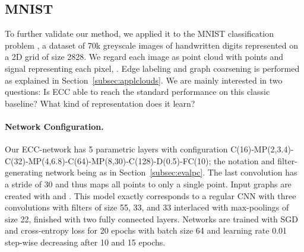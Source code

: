 \documentclass[10pt,twocolumn,letterpaper]{article}
\begin{document}
\begin{table}[bt]
\centering
\addtolength{\tabcolsep}{-3pt}
\addtolength{\tabcolsep}{3pt}
\vspace{1.5ex}
\caption{\label{tab:resgraph}
Mean accuracy (10 folds) on graph classification datasets. Only the best-performing models of each baseline are listed.}
\end{table}





\subsection{MNIST} \label{subsec:evalmnist}

To further validate our method, we applied it to the MNIST classification problem \cite{mnist}, a dataset of 70k greyscale images of handwritten digits represented on a 2D grid of size 2828. We regard each image  as point cloud  with points  and signal  representing each pixel, . Edge labeling and graph coarsening is performed as explained in Section~\ref{subsec:applclouds}. 
We are mainly interested in two questions: Is ECC able to reach the standard performance on this classic baseline? What kind of representation does it learn?

\paragraph*{Network Configuration.}
Our ECC-network has 5 parametric layers with configuration C(16)-MP(2,3.4)-C(32)-MP(4,6.8)-C(64)-MP(8,30)-C(128)-D(0.5)-FC(10); the notation and filter-generating network being as in Section~\ref{subsec:evalpc}. The last convolution has a stride of 30 and thus maps all  points to only a single point. Input graphs are created with  and . This model exactly corresponds to a regular CNN with three convolutions with filters of size 55, 33, and 33 interlaced with max-poolings of size 22, finished with two fully connected layers. Networks are trained with SGD and cross-entropy loss for 20 epochs with batch size 64 and learning rate 0.01 step-wise decreasing after 10 and 15 epochs.
\end{document}
